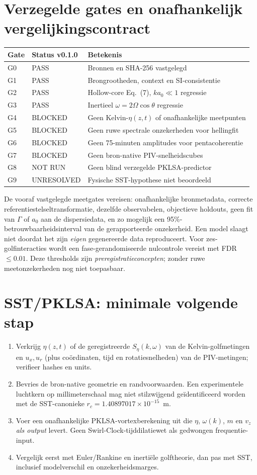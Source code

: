 \documentclass[10pt,a4paper]{article}
\begin{document}
\section{Verzegelde gates en onafhankelijk vergelijkingscontract}
\small
\begin{tabular}{lll}
\toprule
Gate & Status v0.1.0 & Betekenis\\ \midrule
G0 & PASS & Bronnen en SHA-256 vastgelegd\\
G1 & PASS & Brongrootheden, context en SI-consistentie\\
G2 & PASS & Hollow-core Eq.~(7), $ka_0\!\ll\!1$ regressie\\
G3 & PASS & Inertieel $\omega=2\Omega\cos\theta$ regressie\\
G4 & BLOCKED & Geen Kelvin-$\eta(z,t)$ of onafhankelijke meetpunten\\
G5 & BLOCKED & Geen ruwe spectrale onzekerheden voor hellingfit\\
G6 & BLOCKED & Geen 75-minuten amplitudes voor pentacoherentie\\
G7 & BLOCKED & Geen bron-native PIV-snelheidscubes\\
G8 & NOT RUN & Geen blind verzegelde PKLSA-predictor\\
G9 & UNRESOLVED & Fysische SST-hypothese niet beoordeeld\\
\bottomrule
\end{tabular}
\normalsize

De vooraf vastgelegde meetgates vereisen: onafhankelijke bronmetadata, correcte referentiestelseltransformatie, dezelfde observabelen, objectieve holdouts, geen fit van $\Gamma$ of $a_0$ aan de dispersiedata, en zo mogelijk een 95\%-betrouwbaarheidsinterval van de gerapporteerde onzekerheid. Een model slaagt niet doordat het zijn \emph{eigen} gegenereerde data reproduceert. Voor zes-golfinteracties wordt een fase-gerandomiseerde nulcontrole vereist met FDR $\le0.01$. Deze thresholds zijn \emph{preregistratieconcepten}; zonder ruwe meetonzekerheden nog niet toepasbaar.

\section{SST/PKLSA: minimale volgende stap}
\begin{enumerate}
\item Verkrijg $\eta(z,t)$ of de geregistreerde $S_\eta(k,\omega)$ van de Kelvin-golfmetingen en $u_x,u_r$ (plus co\"ordinaten, tijd en rotatiesnelheden) van de PIV-metingen; verifieer hashes en units.
\item Bevries de bron-native geometrie en randvoorwaarden. Een experimentele luchtkern op millimeterschaal mag niet stilzwijgend geïdentificeerd worden met de SST-canonieke $r_c=1.40897017\times10^{-15}$~m.
\item Voer een onafhankelijke PKLSA-vortexberekening uit die $\eta$, $\omega(k)$, $m$ en $v_z$ \emph{als output} levert. Geen Swirl-Clock-tijddilatiewet als gedwongen frequentie-input.
\item Vergelijk eerst met Euler/Rankine en inertiële golftheorie, dan pas met SST, inclusief modelverschil en onzekerheidsmarges.
\end{enumerate}
\end{document}
